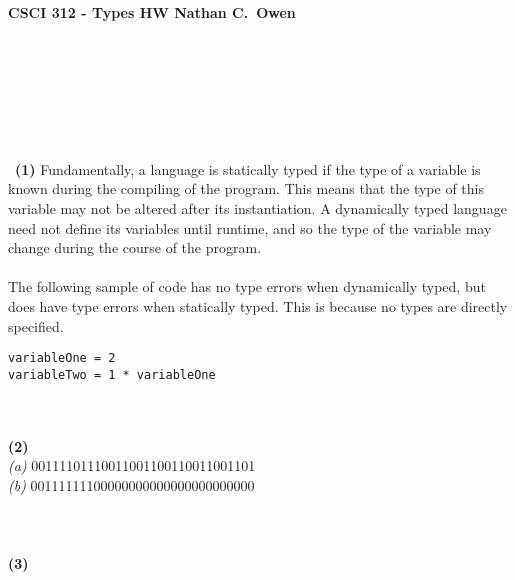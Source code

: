 \documentclass[a4paper,9pt]{extarticle}
\begin{document}
\textbf{CSCI 312 - Types HW \hfill  Nathan C.~Owen} \\ \\
\\\\\\\\\\\\\
\textbf{(1)} Fundamentally, a language is statically typed if the type of a variable is known during the compiling of the program. This means that the type of this variable may not be altered after its instantiation. A dynamically typed language need not define its variables until runtime, and so the type of the variable may change during the course of the program.
\\\\
The following sample of code has no type errors when dynamically typed, but does have type errors when statically typed. This is because no types are directly specified.
\begin{verbatim}
variableOne = 2
variableTwo = 1 * variableOne 
\end{verbatim}~\\\\
\textbf{(2)} \\
\textit{(a)} 00111101110011001100110011001101\\
\textit{(b)} 00111111100000000000000000000000\\\\\\\\
\textbf{(3)}
\end{document}
